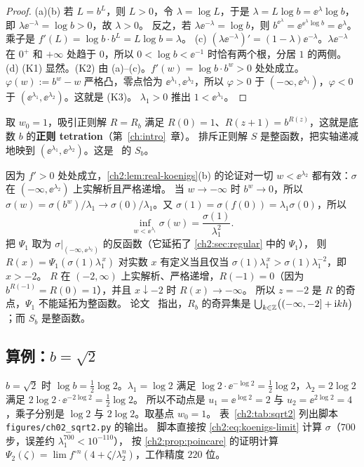 \begin{proof}
(a)(b) 若 $L=b^L$，则 $L>0$，令 $\lambda=\log L$，于是 $\lambda=L\log b=\ee^\lambda\log b$，即 $\lambda\ee^{-\lambda}=\log b>0$，故 $\lambda>0$。
反之，若 $\lambda\ee^{-\lambda}=\log b$，则 $b^{\ee^\lambda}=\ee^{\ee^\lambda\log b}=\ee^{\lambda}$。乘子是 $f'(L)=\log b\cdot b^L=L\log b=\lambda$。
(c) $(\lambda\ee^{-\lambda})'=(1-\lambda)\ee^{-\lambda}$。$\lambda\ee^{-\lambda}$ 在 $0^+$ 和 $+\infty$ 处趋于 $0$，所以 $0<\log b<\ee^{-1}$ 时恰有两个根，分居 $1$ 的两侧。
(d) (K1) 显然。(K2) 由 (a)--(c)。$f'(w)=\log b\cdot b^w>0$ 处处成立。
$\varphi(w):=b^w-w$ 严格凸，零点恰为 $\ee^{\lambda_1},\ee^{\lambda_2}$，所以 $\varphi>0$ 于 $(-\infty,\ee^{\lambda_1})$，$\varphi<0$ 于 $(\ee^{\lambda_1},\ee^{\lambda_2})$。这就是 (K3)。
$\lambda_1>0$ 推出 $1<\ee^{\lambda_1}$。
\end{proof}

取 $w_0=1$，吸引正则解 $R=R_b$ 满足 $R(0)=1$、$R(z+1)=b^{R(z)}$，这就是底数 $b$ 的\textbf{正则 tetration}（第~\ref{ch:intro}~章）。
排斥正则解 $S$ 是整函数，把实轴递减地映到 $(\ee^{\lambda_1},\ee^{\lambda_2})$。这是~\cite[\S3.1]{KneserPaper} 的 $S_b$。

\begin{example}[$R_b$ 的实轴与奇点]\label{ch2:ex:bw-singular}
因为 $f'>0$ 处处成立，\cref{ch2:lem:real-koenigs}(b) 的论证对一切 $w<\ee^{\lambda_2}$ 都有效：$\sigma$ 在 $(-\infty,\ee^{\lambda_2})$ 上实解析且严格递增。
当 $w\to-\infty$ 时 $b^w\to0$，所以 $\sigma(w)=\sigma(b^w)/\lambda_1\to\sigma(0)/\lambda_1$。又 $\sigma(1)=\sigma(f(0))=\lambda_1\sigma(0)$，所以
\[
  \inf_{w<\ee^{\lambda_1}}\sigma(w)=\frac{\sigma(1)}{\lambda_1^{2}} .
\]
把 $\Psi_1$ 取为 $\sigma|_{(-\infty,\ee^{\lambda_2})}$ 的反函数（它延拓了 \cref{ch2:sec:regular} 中的 $\Psi_1$），
则 $R(x)=\Psi_1(\sigma(1)\lambda_1^{\,x})$ 对实数 $x$ 有定义当且仅当 $\sigma(1)\lambda_1^{\,x}>\sigma(1)\lambda_1^{-2}$，即 $x>-2$。
$R$ 在 $(-2,\infty)$ 上实解析、严格递增，$R(-1)=0$（因为 $b^{R(-1)}=R(0)=1$），并且 $x\downarrow-2$ 时 $R(x)\to-\infty$。
所以 $z=-2$ 是 $R$ 的奇点，$\Psi_1$ 不能延拓为整函数。
论文~\cite[\S3.3]{KneserPaper} 指出，$R_b$ 的奇异集是 $\bigcup_{k\in\mathbb{Z}}\bigl((-\infty,-2]+\mathrm{i} kh\bigr)$；而 $S_b$ 是整函数。
\end{example}

\subsection{算例：$b=\sqrt2$}

\begin{example}[$b=\sqrt2$ 的正则解]\label{ch2:ex:sqrt2}
$b=\sqrt2$ 时 $\log b=\frac12\log2$。$\lambda_1=\log2$ 满足 $\log2\cdot\ee^{-\log2}=\frac12\log2$，$\lambda_2=2\log2$ 满足 $2\log2\cdot\ee^{-2\log2}=\frac12\log2$。
所以不动点是 $u_1=\ee^{\log2}=2$ 与 $u_2=\ee^{2\log2}=4$，乘子分别是 $\log2$ 与 $2\log2$。取基点 $w_0=1$。
表~\ref{ch2:tab:sqrt2} 列出脚本 \texttt{figures/ch02\_sqrt2.py} 的输出。
脚本直接按 \eqref{ch2:eq:koenigs-limit} 计算 $\sigma$（$700$ 步，误差约 $\lambda_1^{700}<10^{-110}$），
按 \cref{ch2:prop:poincare} 的证明计算 $\Psi_2(\zeta)=\lim f^{\circ n}(4+\zeta/\lambda_2^n)$，工作精度 $220$ 位。
\end{example}

